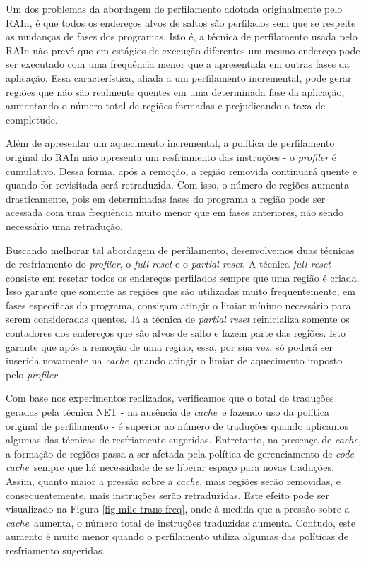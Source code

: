 \documentclass[12pt,twoside]{article}
\newcommand{\ccache}{\emph{code cache}}
\newcommand{\cache}{\emph{cache}}
\begin{document}
Um dos problemas da abordagem de perfilamento adotada originalmente pelo RAIn, é que todos os endereços alvos de saltos são perfilados sem que se respeite as mudanças de fases dos programas. Isto é, a técnica de perfilamento usada pelo RAIn não prevê que em estágios de execução diferentes um mesmo endereço pode ser executado com uma frequência menor que a apresentada em outras fases da aplicação. Essa característica, aliada a um perfilamento incremental, pode gerar regiões que não são realmente quentes em uma determinada fase da aplicação, aumentando o número total de regiões formadas e prejudicando a taxa de completude.

Além de apresentar um aquecimento incremental, a política de perfilamento original do RAIn não apresenta um resfriamento das instruções - o \emph{profiler} é cumulativo. Dessa forma, após a remoção, a região removida continuará quente e quando for revisitada será retraduzida. Com isso, o número de regiões aumenta drasticamente, pois em determinadas fases do programa a região pode ser acessada com uma frequência muito menor que em fases anteriores, não sendo necessário uma retradução.

Buscando melhorar tal abordagem de perfilamento, desenvolvemos duas técnicas de resfriamento do \emph{profiler}, o \emph{full reset} e o \emph{partial reset}. A técnica \emph{full reset} consiste em resetar todos os endereços perfilados sempre que uma região é criada. Isso garante que somente as regiões que são utilizadas muito frequentemente, em fases específicas do programa, consigam atingir o limiar mínimo necessário para serem consideradas quentes. Já a técnica de \emph{partial reset} reinicializa somente os contadores dos endereços que são alvos de salto e fazem parte das regiões. Isto garante que após a remoção de uma região, essa, por sua vez, só poderá ser inserida novamente na \cache~quando atingir o limiar de aquecimento imposto pelo \emph{profiler}.

Com base nos experimentos realizados, verificamos que o total de traduções geradas pela técnica NET - na ausência de \cache~e fazendo uso da política original de perfilamento - é superior ao número de traduções quando aplicamos algumas das técnicas de resfriamento sugeridas. Entretanto, na presença de \cache, a formação de regiões passa a ser afetada pela política de gerenciamento de \ccache~sempre que há necessidade de se liberar espaço para novas traduções. Assim, quanto maior a pressão sobre a \cache, mais regiões serão removidas, e consequentemente, mais instruções serão retraduzidas. Este efeito pode ser visualizado na Figura \ref{fig-milc-trans-freq}, onde à medida que a pressão sobre a \cache~aumenta, o número total de instruções traduzidas aumenta. Contudo, este aumento é muito menor quando o perfilamento utiliza algumas das políticas de resfriamento sugeridas.
\end{document}
